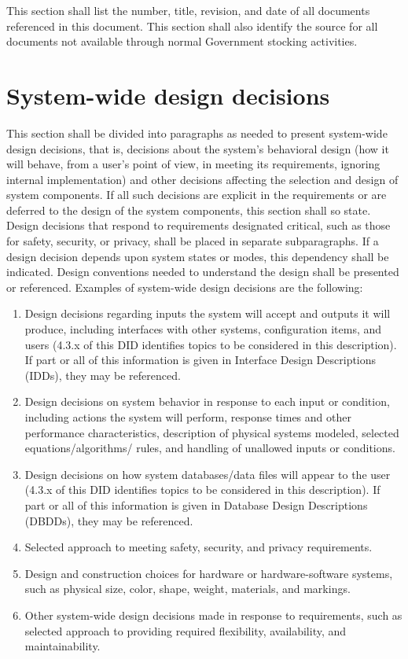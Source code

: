 \documentclass{fidata-report-template}
\begin{document}
This section shall list the number, title, revision, and date of all
documents referenced in this document. This section shall also identify
the source for all documents not available through normal Government
stocking activities.

\section{System-wide design decisions}

This section shall be divided into paragraphs as needed to present
system-wide design decisions, that is, decisions about the system's
behavioral design (how it will behave, from a user's point of view, in
meeting its requirements, ignoring internal implementation) and other
decisions affecting the selection and design of system components. If
all such decisions are explicit in the requirements or are deferred to
the design of the system components, this section shall so state. Design
decisions that respond to requirements designated critical, such as
those for safety, security, or privacy, shall be placed in separate
subparagraphs. If a design decision depends upon system states or modes,
this dependency shall be indicated. Design conventions needed to
understand the design shall be presented or referenced. Examples of
system-wide design decisions are the following:

\begin{enumerate}
\itemsep1pt\parskip0pt
\item
  Design decisions regarding inputs the system will accept and outputs
  it will produce, including interfaces with other systems,
  configuration items, and users (4.3.x of this DID identifies topics to
  be considered in this description). If part or all of this information
  is given in Interface Design Descriptions (IDDs), they may be
  referenced.
\item
  Design decisions on system behavior in response to each input or
  condition, including actions the system will perform, response times
  and other performance characteristics, description of physical systems
  modeled, selected equations/algorithms/ rules, and handling of
  unallowed inputs or conditions.
\item
  Design decisions on how system databases/data files will appear to the
  user (4.3.x of this DID identifies topics to be considered in this
  description). If part or all of this information is given in Database
  Design Descriptions (DBDDs), they may be referenced.
\item
  Selected approach to meeting safety, security, and privacy
  requirements.
\item
  Design and construction choices for hardware or hardware-software
  systems, such as physical size, color, shape, weight, materials, and
  markings.
\item
  Other system-wide design decisions made in response to requirements,
  such as selected approach to providing required flexibility,
  availability, and maintainability.
\end{enumerate}
\end{document}
